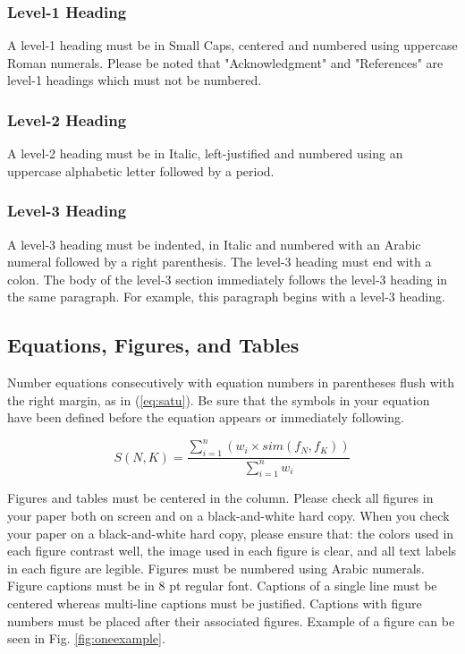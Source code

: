 \documentclass[]{indojc_single}
\begin{document}
\subsubsection{Level-1 Heading}
A level-1 heading must be in Small Caps, centered and numbered using uppercase Roman numerals. Please be noted that "Acknowledgment" and "References" are level-1 headings which must not be numbered.

\subsubsection{Level-2 Heading}
A level-2 heading must be in Italic, left-justified and numbered using an uppercase alphabetic letter followed by a period. 

\subsubsection{Level-3 Heading} 
A level-3 heading must be indented, in Italic and numbered with an Arabic numeral followed by a right parenthesis. The level-3 heading must end with a colon. The body of the level-3 section immediately follows the level-3 heading in the same paragraph. For example, this paragraph begins with a level-3 heading.

\subsection{Equations, Figures, and Tables}
Number equations consecutively with equation numbers in parentheses flush with the right margin, as in (\ref{eq:satu}). Be sure that the symbols in your equation have been defined before the equation appears or immediately following. 

\begin{equation}
S(N,K) = \frac{\sum_{i=1}^n(w_i\times sim(f_N,f_K))}{\sum_{i=1}^nw_i}
\label{eq:satu}
\end{equation}


Figures and tables must be centered in the column. Please check all figures in your paper both on screen and on a black-and-white hard copy. When you check your paper on a black-and-white hard copy, please ensure that: the colors used in each figure contrast well, the image used in each figure is clear, and all text labels in each figure are legible. Figures must be numbered using Arabic numerals. Figure captions must be in 8 pt regular font. Captions of a single line must be centered whereas multi-line captions must be justified. Captions with figure numbers must be placed after their associated figures. Example of a figure can be seen in Fig. \ref{fig:oneexample}.
\end{document}
